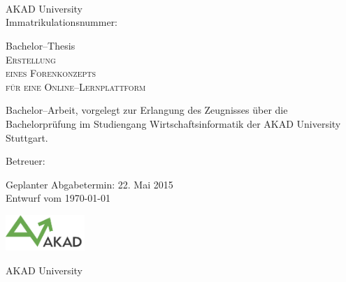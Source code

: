 

\begin{titlepage}


\vspace{5cm}

\Name \\ 
\Strasse \\ 
\PlzOrt\\ 
\href{mailto:\Email}{\Email}

AKAD University\\
Immatrikulationsnummer: \Immatrikulationsnummer

\vfill

Bachelor--Thesis\\
\LARGE
\textsc{Erstellung\\
eines Forenkonzepts\\
für eine Online--Lernplattform}

\vfill

\normalsize

Bachelor--Arbeit, vorgelegt zur Erlangung des Zeugnisses über die Bachelorprüfung im Studiengang Wirtschaftsinformatik der AKAD University Stuttgart.

Betreuer: \Betreuer

Geplanter Abgabetermin: 22. Mai 2015\\
Entwurf vom \today %


\vfill

\includegraphics[width=3cm]{akad_logo.png}  

AKAD University 

\end{titlepage}



\normalsize
